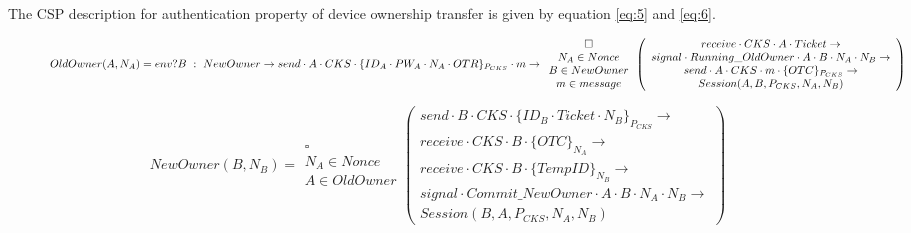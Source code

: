 \documentclass[letterpaper]{article}
\begin{document}
The CSP description for authentication property of device ownership transfer is given by equation \eqref{eq:5} and \eqref{eq:6}.
\begin{figure*}[bpht!]
\begin{dmath}\label{eq:5}
OldOwner(A,N_{A})=env?B \ :\ NewOwner\rightarrow send \cdot A \cdot CKS \cdot \{ID_{A}\cdot PW_{A} \cdot N_{A} \cdot OTR\}_{P_{CKS}} \cdot m \rightarrow \\
\begin{array}{c} \square \\N_{A}\in Nonce \\ B\in NewOwner \\ m \in  message \end{array} \left(\begin{array}{c} receive \cdot CKS \cdot A \cdot Ticket \rightarrow \\ 
signal \cdot Running\_OldOwner \cdot A \cdot B \cdot N_{A} \cdot N_{B}\rightarrow \\
send \cdot A \cdot CKS \cdot m \cdot \{OTC\}_{P_{CKS}}\rightarrow \\ 
Session(A,B,P_{CKS},N_{A},N_{B})\end{array} \right)
\end{dmath}
\end{figure*}

\begin{figure*}[bpht!] 	
\begin{dmath}\label{eq:6}
NewOwner(B,N_{B})= \begin{array}{c} \square \\N_{A}\in Nonce \\ A\in OldOwner \end{array} \left(\begin{array}{c} send \cdot B \cdot CKS \cdot \{ID_{B} \cdot Ticket \cdot N_{B}\}_{P_{CKS}}     \rightarrow \\ receive \cdot CKS \cdot B \cdot \{OTC\}_{N_{A}} \rightarrow \\
receive\cdot CKS \cdot B \cdot  \{TempID\}_{N_{B}} \rightarrow \\ 
signal \cdot Commit\_NewOwner \cdot A \cdot B \cdot N_{A} \cdot N_{B}\rightarrow \\
Session(B,A,P_{CKS},N_{A},N_{B})\end{array} \right)
\end{dmath}
\end{figure*}
\end{document}
